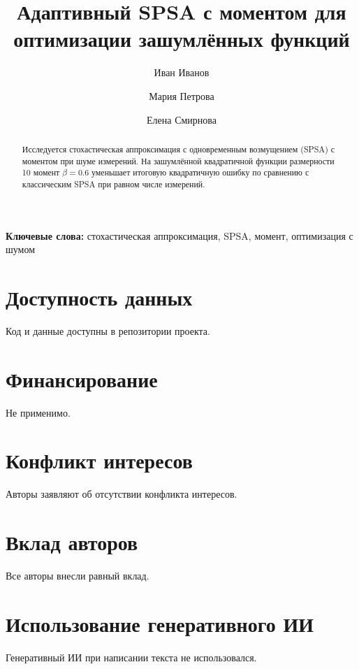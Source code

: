 \documentclass[11pt]{article}
\title{Адаптивный SPSA с моментом для оптимизации зашумлённых функций}
\author[1]{Иван Иванов}
\author[1]{Мария Петрова}
\author[1]{Елена Смирнова}
\affil[1]{Лаборатория стохастической оптимизации, Университет-Пример}
\newcommand{\keywords}[1]{\par\noindent\textbf{Ключевые слова:} #1}
\begin{document}
\maketitle

\begin{abstract}
Исследуется стохастическая аппроксимация с одновременным возмущением (SPSA) с моментом при шуме измерений. На зашумлённой квадратичной функции размерности 10 момент $\beta = 0.6$ уменьшает итоговую квадратичную ошибку по сравнению с классическим SPSA при равном числе измерений.
\end{abstract}
\keywords{стохастическая аппроксимация, SPSA, момент, оптимизация с шумом}







\section*{Доступность данных}
Код и данные доступны в репозитории проекта.

\section*{Финансирование}
Не применимо.

\section*{Конфликт интересов}
Авторы заявляют об отсутствии конфликта интересов.

\section*{Вклад авторов}
Все авторы внесли равный вклад.

\section*{Использование генеративного ИИ}
Генеративный ИИ при написании текста не использовался.



\end{document}
